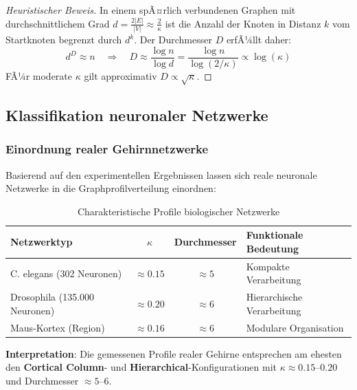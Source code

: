 ﻿\documentclass[a4paper,12pt]{article}
\theoremstyle{definition}
\begin{document}
	\begin{proof}[Heuristischer Beweis]
		In einem spÃ¤rlich verbundenen Graphen mit durchschnittlichem Grad $d = \frac{2|E|}{|V|} \approx \frac{2}{\kappa}$ ist die Anzahl der Knoten in Distanz $k$ vom Startknoten begrenzt durch $d^k$. Der Durchmesser $D$ erfÃ¼llt daher:
		\[
		d^D \approx n \quad \Rightarrow \quad D \approx \frac{\log n}{\log d} = \frac{\log n}{\log(2/\kappa)} \propto \log(\kappa)
		\]
		FÃ¼r moderate $\kappa$ gilt approximativ $D \propto \sqrt{\kappa}$.
	\end{proof}
	
	\subsection{Klassifikation neuronaler Netzwerke}
	
	\subsubsection{Einordnung realer Gehirnnetzwerke}
	
	Basierend auf den experimentellen Ergebnissen lassen sich reale neuronale Netzwerke in die Graphprofilverteilung einordnen:
	
	\begin{table}[H]
		\centering
		\caption{Charakteristische Profile biologischer Netzwerke}
		\label{tab:bio_profiles}
		\begin{tabular}{lccl}
			\hline
			\textbf{Netzwerktyp} & $\kappa$ & \textbf{Durchmesser} & \textbf{Funktionale Bedeutung} \\
			\hline
			C. elegans (302 Neuronen) & $\approx 0.15$ & $\approx 5$ & Kompakte Verarbeitung \\
			Drosophila (135.000 Neuronen) & $\approx 0.20$ & $\approx 6$ & Hierarchische Verarbeitung \\
			Maus-Kortex (Region) & $\approx 0.16$ & $\approx 6$ & Modulare Organisation \\
			\hline
		\end{tabular}
	\end{table}
	
	\textbf{Interpretation}: Die gemessenen Profile realer Gehirne entsprechen am ehesten den \textbf{Cortical Column}- und \textbf{Hierarchical}-Konfigurationen mit $\kappa \approx 0.15\text{--}0.20$ und Durchmesser $\approx 5\text{--}6$.
\end{document}
